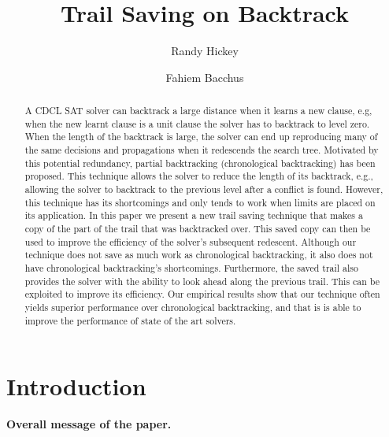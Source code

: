 \documentclass[runningheads]{llncs}
\title{Trail Saving on Backtrack}
\author{Randy Hickey \and Fahiem Bacchus}
\institute{Department of Computer Science, University of Toronto, Canada\\
  \email{rgh000@gmail.com, fbacchus@cs.toronto.edu}}
\newcommand{\sat}{SAT\xspace}
\begin{document}
\maketitle
\begin{abstract}
    A CDCL \sat solver can backtrack a large distance when it learns a
    new clause, e.g, when the new learnt clause is a unit clause the
    solver has to backtrack to level zero. When the length of the
    backtrack is large, the solver can end up reproducing many of the
    same decisions and propagations when it redescends the search
    tree. Motivated by this potential redundancy, partial backtracking
    (chronological backtracking) has been proposed. This technique
    allows the solver to reduce the length of its backtrack, e.g.,
    allowing the solver to backtrack to the previous level after a
    conflict is found. However, this technique has its shortcomings
    and only tends to work when limits are placed on its
    application. In this paper we present a new trail saving technique
    that makes a copy of the part of the trail that was backtracked
    over. This saved copy can then be used to improve the efficiency
    of the solver's subsequent redescent. Although our technique does
    not save as much work as chronological backtracking, it also does
    not have chronological backtracking's shortcomings. Furthermore,
    the saved trail also provides the solver with the ability to look
    ahead along the previous trail. This can be exploited to improve
    its efficiency. Our empirical results show that our technique
    often yields superior performance over chronological backtracking,
    and that is is able to improve the performance of state of the art
    solvers.

\end{abstract}

\section{Introduction}
\textbf{Overall message of the paper.}


\end{document}
